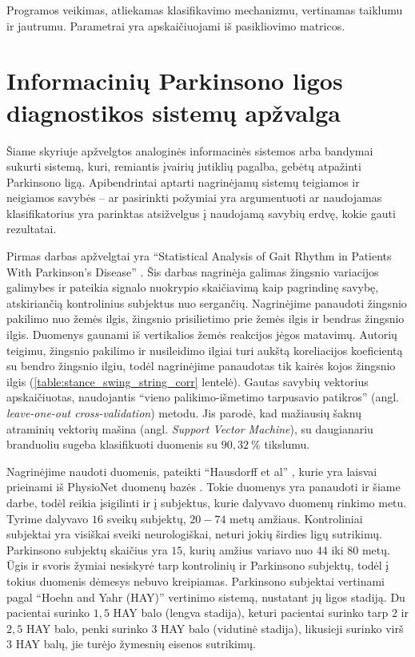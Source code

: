 \documentclass[]{vgtuef}
\begin{document}
Programos veikimas, atliekamas klasifikavimo mechanizmu, vertinamas taiklumu ir jautrumu. Parametrai yra apskaičiuojami iš pasikliovimo matricos.

\section{Informacinių Parkinsono ligos diagnostikos sistemų apžvalga}

Šiame skyriuje apžvelgtos analoginės informacinės sistemos arba bandymai sukurti sistemą, kuri, remiantis įvairių jutiklių pagalba, gebėtų atpažinti Parkinsono ligą. Apibendrintai aptarti nagrinėjamų sistemų teigiamos ir neigiamos savybės -- ar pasirinkti požymiai yra argumentuoti ar naudojamas klasifikatorius yra parinktas atsižvelgus į naudojamą savybių erdvę, kokie gauti rezultatai.


Pirmas darbas apžvelgtai yra ``Statistical Analysis of Gait Rhythm in Patients With Parkinson's Disease'' \cite{5280353}. Šis darbas nagrinėja galimas žingsnio variacijos galimybes ir pateikia signalo nuokrypio skaičiavimą kaip pagrindinę savybę, atskiriančią kontrolinius subjektus nuo sergančių. Nagrinėjime panaudoti žingsnio pakilimo nuo žemės ilgis, žingsnio prisilietimo prie žemės ilgis ir bendras žingsnio ilgis. Duomenys gaunami iš vertikalios žemės reakcijos jėgos matavimų. Autorių teigimu, žingsnio pakilimo ir nusileidimo ilgiai turi aukštą koreliacijos koeficientą su bendro žingsnio ilgiu, todėl nagrinėjime panaudotas tik kairės kojos žingsnio ilgis (\ref{table:stance_swing_string_corr} lentelė). Gautas savybių vektorius apskaičiuotas, naudojantis ``vieno palikimo-išmetimo tarpusavio patikros'' (angl. \textit{leave-one-out cross-validation}) metodu. Jis parodė, kad mažiausių šaknų atraminių vektorių mašina (angl. \textit{Support Vector Machine}), su daugianariu branduoliu sugeba klasifikuoti duomenis su $90,32~\%$ tikslumu. 

Nagrinėjime naudoti duomenis, pateikti ``Hausdorff et al'' \cite{MDS:MDS870130310}, kurie yra laisvai prieinami iš PhysioNet duomenų bazės \cite{932728}. Tokie duomenys yra panaudoti ir šiame darbe, todėl reikia įsigilinti ir į subjektus, kurie dalyvavo duomenų rinkimo metu. Tyrime dalyvavo $16$ sveikų subjektų, $20-74$ metų amžiaus. Kontroliniai subjektai yra visiškai sveiki neurologiškai, neturi jokių širdies ligų sutrikimų. Parkinsono subjektų skaičius yra $15$, kurių amžius variavo nuo $44$ iki $80$ metų. Ūgis ir svoris žymiai nesiskyrė tarp kontrolinių ir Parkinsono subjektų, todėl į tokius duomenis dėmesys nebuvo kreipiamas. Parkinsono subjektai vertinami pagal ``Hoehn and Yahr (HAY)'' vertinimo sistemą, nustatant jų ligos stadiją. Du pacientai surinko $1,5$ HAY balo (lengva stadija), keturi pacientai surinko tarp $2$ ir $2,5$ HAY balo, penki surinko $3$ HAY balo (vidutinė stadija), likusieji surinko virš $3$ HAY balų, jie turėjo žymesnių eisenos sutrikimų. 
\end{document}
